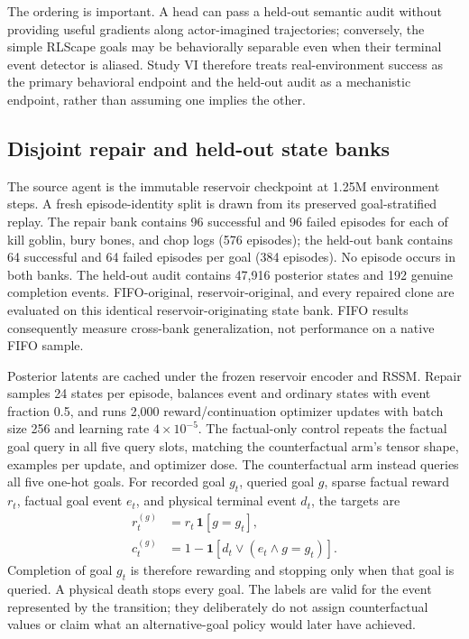 \documentclass[10pt]{article}
\begin{document}
The ordering is important. A head can pass a held-out semantic audit without
providing useful gradients along actor-imagined trajectories; conversely, the
simple RLScape goals may be behaviorally separable even when their terminal
event detector is aliased. Study VI therefore treats real-environment success
as the primary behavioral endpoint and the held-out audit as a mechanistic
endpoint, rather than assuming one implies the other.

\subsection{Disjoint repair and held-out state banks}

The source agent is the immutable reservoir checkpoint at 1.25M environment
steps. A fresh episode-identity split is drawn from its preserved
goal-stratified replay. The repair bank contains 96 successful and 96 failed
episodes for each of kill goblin, bury bones, and chop logs (576 episodes); the
held-out bank contains 64 successful and 64 failed episodes per goal (384
episodes). No episode occurs in both banks. The held-out audit contains 47,916
posterior states and 192 genuine completion events. FIFO-original,
reservoir-original, and every repaired clone are evaluated on this identical
reservoir-originating state bank. FIFO results consequently measure
cross-bank generalization, not performance on a native FIFO sample.

Posterior latents are cached under the frozen reservoir encoder and RSSM.
Repair samples 24 states per episode, balances event and ordinary states with
event fraction 0.5, and runs 2,000 reward/continuation optimizer updates with
batch size 256 and learning rate $4\times10^{-5}$. The factual-only control
repeats the factual goal query in all five query slots, matching the
counterfactual arm's tensor shape, examples per update, and optimizer dose.
The counterfactual arm instead queries all five one-hot goals. For recorded
goal $g_t$, queried goal $g$, sparse factual reward $r_t$, factual goal event
$e_t$, and physical terminal event $d_t$, the targets are
\begin{align}
 r_t^{(g)} &= r_t\,\mathbf 1[g=g_t],\\
 c_t^{(g)} &= 1-\mathbf 1[d_t\lor(e_t\land g=g_t)].
\end{align}
Completion of goal $g_t$ is therefore rewarding and stopping only when that
goal is queried. A physical death stops every goal. The labels are valid for
the event represented by the transition; they deliberately do not assign
counterfactual values or claim what an alternative-goal policy would later
have achieved.
\end{document}
